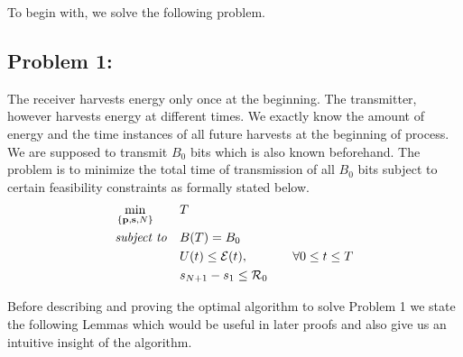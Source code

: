 To begin with, we solve the following problem.
\subsection{Problem 1:}
The receiver harvests energy only once at the beginning. The transmitter, however harvests energy at different times. We exactly know the amount of energy and the time instances of all future harvests at the beginning of process.  We are supposed to transmit $B_0$ bits which is also known beforehand. The problem is to minimize the total time of transmission of all $B_0$ bits subject to certain feasibility constraints as formally stated below.
\begin{align}
&\min_{\{\textbf{p},\textbf{s},N\}}			&& T
\\
&\text{\textit{subject to}} 				&& B(T)=B_0 
\label{pb1_constraint_bits}
\\
&     										&& U(t)\le \mathcal{E}(t),  		&&& \forall 0\le t\le T \label{pb1_constraint_energy}
\\
&    										&& s_{N+1}-s_1\le \mathcal{R}_0
\label{pb1_constraint_time}
\end{align}

Before describing and proving the optimal algorithm to solve Problem 1 we state the following Lemmas which would be useful in later proofs and also give us an intuitive insight of the algorithm.



